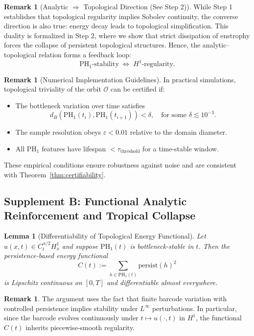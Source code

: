 \documentclass[11pt]{article}
\newtheorem{lemma}[theorem]{Lemma}
\theoremstyle{definition}
\newtheorem{remark}[theorem]{Remark}
\begin{document}
\begin{remark}[Analytic $\Rightarrow$ Topological Direction (See Step 2)]
While Step 1 establishes that topological regularity implies Sobolev continuity, the converse direction is also true: energy decay leads to topological simplification. This duality is formalized in Step 2, where we show that strict dissipation of enstrophy forces the collapse of persistent topological structures. Hence, the analytic–topological relation forms a feedback loop:
\[
\mathrm{PH}_1\text{-stability} \;\Longleftrightarrow\; H^1\text{-regularity}.
\]
\end{remark}

\begin{remark}[Numerical Implementation Guidelines]
In practical simulations, topological triviality of the orbit $\mathcal{O}$ can be certified if:
\begin{itemize}
    \item The bottleneck variation over time satisfies
    \[
    d_B(\mathrm{PH}_1(t_i), \mathrm{PH}_1(t_{i+1})) < \delta, \quad \text{for some } \delta \lesssim 10^{-3}.
    \]
    \item The sample resolution obeys $\varepsilon < 0.01$ relative to the domain diameter.
    \item All $\mathrm{PH}_1$ features have lifespan $< \tau_\text{threshold}$ for a time-stable window.
\end{itemize}
These empirical conditions ensure robustness against noise and are consistent with Theorem~\ref{thm:certifiability}.
\end{remark}

\subsection*{Supplement B: Functional Analytic Reinforcement and Tropical Collapse}

\begin{lemma}[Differentiability of Topological Energy Functional]
\label{lem:Ct_differentiable}
Let $u(x,t) \in C^{\alpha/2}_t H^1_x$ and suppose $\mathrm{PH}_1(t)$ is bottleneck-stable in $t$. Then the persistence-based energy functional
\[
C(t) := \sum_{h \in \mathrm{PH}_1(t)} \mathrm{persist}(h)^2
\]
is Lipschitz continuous on $[0,T]$ and differentiable almost everywhere.
\end{lemma}

\begin{remark}
The argument uses the fact that finite barcode variation with controlled persistence implies stability under $L^\infty$ perturbations. In particular, since the barcode evolves continuously under $t \mapsto u(\cdot,t)$ in $H^1$, the functional $C(t)$ inherits piecewise-smooth regularity.
\end{remark}
\end{document}

